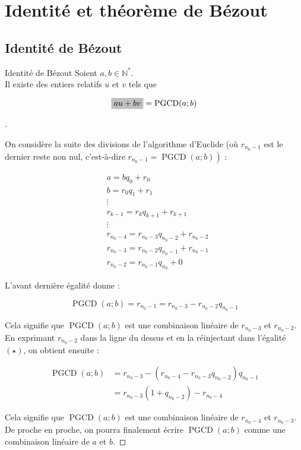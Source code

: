 \documentclass[12pt]{article}
\newcommand{\hideM}[1]{\mbox{\vphantom{$#1$}\smash{\colorbox{gray!50}{$\displaystyle #1$}}} }
\theoremstyle{break}
\newenvironment{demo}[1][\proofname]{%
  \begin{proof}[#1]$ $\newline
}{%
  \end{proof}
}
\begin{document}
\section{Identité et théorème de Bézout}
\subsection{Identité de Bézout}
\begin{proposition}{Identité de Bézout}{}
Soient $a, b \in \mathbb{N}^{*}$.\\
Il existe des entiers relatifs $u$ et $v$ tels que

$$
\hideM{a u+b v}=\operatorname{PGCD}(a ; b)
$$
\end{proposition}

\begin{demo}
On considère la suite des divisions de l'algorithme d'Euclide (où $r_{n_{0}-1}$ est le dernier reste non nul, c'est-à-dire $\left.r_{n_{0}-1}=\operatorname{PGCD}(a ; b)\right)$ :

$$
\begin{aligned}
& a=b q_{0}+r_{0} \\
& b=r_{0} q_{1}+r_{1} \\
& \vdots \\
& r_{k-1}=r_{k} q_{k+1}+r_{k+1} \\
& \vdots \\
& r_{n_{0}-4}= r_{n_{0}-3} q_{n_{0}-2}+r_{n_{0}-2}\\
& r_{n_{0}-3}= r_{n_{0}-2} q_{n_{0}-1}+r_{n_{0}-1} \\
& r_{n_{0}-2}=r_{n_{0}-1} q_{n_{0}}+0
\end{aligned}
$$

L'avant dernière égalité donne :


\begin{equation*}
\operatorname{PGCD}(a ; b)=r_{n_{0}-1}=r_{n_{0}-3}-r_{n_{0}-2} q_{n_{0}-1} \tag{$\star$}
\end{equation*}

Cela signifie que $\operatorname{PGCD}(a ; b)$ est une combinaison linéaire de $r_{n_{0}-3}$ et $r_{n_{0}-2}$. En exprimant $r_{n_{0}-2}$ dans la ligne du dessus et en la réinjectant dans l'égalité $\left({\star}\right)$, on obtient ensuite :

$$
\begin{aligned}
\operatorname{PGCD}(a ; b) & =r_{n_{0}-3}-\left(r_{n_{0}-4}-r_{n_{0}-3} q_{n_{0}-2}\right) q_{n_{0}-1} \\
& =r_{n_{0}-3}\left(1+q_{n_{0}-2}\right)-r_{n_{0}-4}
\end{aligned}
$$

Cela signifie que $\operatorname{PGCD}(a ; b)$ est une combinaison linéaire de $r_{n_{0}-4}$ et $r_{n_{0}-3}$. De proche en proche, on pourra finalement écrire $\operatorname{PGCD}(a ; b)$ comme une combinaison linéaire de $a$ et $b$.
\end{demo}
\end{document}
